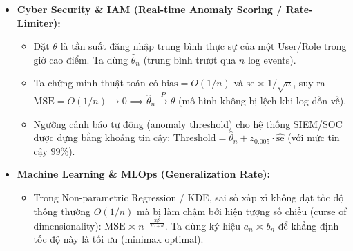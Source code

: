 \begin{itemize}
\item \textbf{Cyber Security \& IAM (Real-time Anomaly Scoring / Rate-Limiter):}
  \begin{itemize}
  \item Đặt $\theta$ là tần suất đăng nhập trung bình thực sự của một User/Role trong giờ cao điểm. Ta dùng $\widehat\theta_n$ (trung bình trượt qua $n$ log events).
  \item Ta chứng minh thuật toán có $\mathrm{bias}=O(1/n)$ và $\mathrm{se}\asymp 1/\sqrt{n}$, suy ra $\mathrm{MSE}=O(1/n)\to 0 \implies \widehat\theta_n\xrightarrow{P}\theta$ (mô hình không bị lệch khi log dồn về).
  \item Ngưỡng cảnh báo tự động (anomaly threshold) cho hệ thống SIEM/SOC được dựng bằng khoảng tin cậy: $\mathrm{Threshold}=\widehat\theta_n+z_{0.005}\cdot\widehat{\mathrm{se}}$ (với mức tin cậy $99\%$).
  \end{itemize}
\item \textbf{Machine Learning \& MLOps (Generalization Rate):}
  \begin{itemize}
  \item Trong Non-parametric Regression / KDE, sai số xấp xỉ không đạt tốc độ thông thường $O(1/n)$ mà bị làm chậm bởi hiện tượng số chiều (curse of dimensionality): $\mathrm{MSE}\asymp n^{-\frac{2\beta}{2\beta+d}}$. Ta dùng ký hiệu $a_n\asymp b_n$ để khẳng định tốc độ này là tối ưu (minimax optimal).
  \end{itemize}
\end{itemize}




